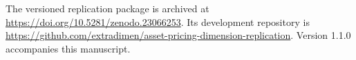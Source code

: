 The versioned replication package is archived at \url{https://doi.org/10.5281/zenodo.23066253}. Its development repository is \url{https://github.com/extradimen/asset-pricing-dimension-replication}. Version 1.1.0 accompanies this manuscript.
